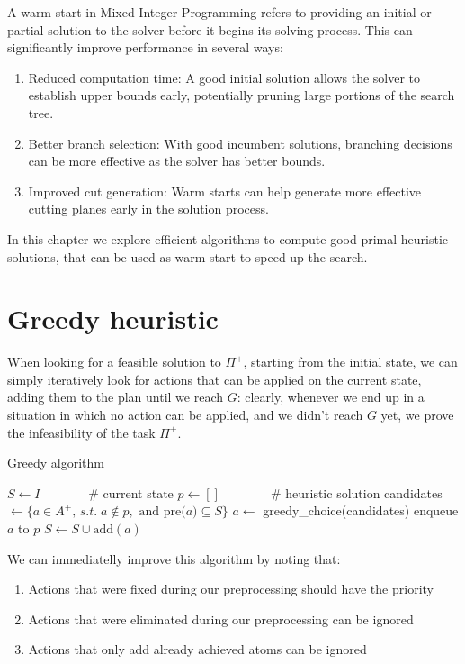 A warm start in Mixed Integer Programming refers to providing an initial or partial solution to the solver before it begins its solving process. This can significantly improve performance in several ways:
\begin{enumerate}
    \item Reduced computation time: A good initial solution allows the solver to establish upper bounds early, potentially pruning large portions of the search tree.
    \item Better branch selection: With good incumbent solutions, branching decisions can be more effective as the solver has better bounds.
    \item Improved cut generation: Warm starts can help generate more effective cutting planes early in the solution process.
\end{enumerate}

In this chapter we explore efficient algorithms to compute good primal heuristic solutions, that can be used as warm start to speed up the search.

\section{Greedy heuristic}
When looking for a feasible solution to $\Pi^+$, starting from the initial state, we can simply iteratively look for actions that can be applied on the current state, adding them to the plan until we reach $G$: clearly, whenever we end up in a situation in which no action can be applied, and we didn't reach $G$ yet, we prove the infeasibility of the task $\Pi^+$.
\begin{algorithm}[h]
    \caption{Greedy algorithm}
    \begin{algorithmic}
        \State $S\gets I\qquad\quad\;\;\;$\# current state
        \State $p\gets []\qquad\qquad$\# heuristic solution
            \State candidates $\gets\{a\in A^+,\,s.t.\;a\not\in p,\mbox{ and pre(}a)\subseteq S\}$
            \State $a\gets$ greedy\_choice(candidates)
            \State enqueue $a$ to $p$
            \State $S\gets S\cup\mbox{add}(a)$
        \EndWhile
    \end{algorithmic}
\end{algorithm}

We can immediatelly improve this algorithm by noting that:
\begin{enumerate}
    \item Actions that were fixed during our preprocessing should have the priority
    \item Actions that were eliminated during our preprocessing can be ignored
    \item Actions that only add already achieved atoms can be ignored
\end{enumerate}

